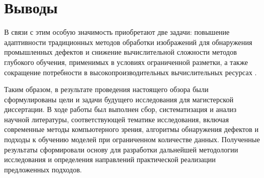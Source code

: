 \documentclass[14pt,a4paper]{article}
\begin{document}
\section{Выводы}
В связи с этим особую значимость приобретают две задачи: повышение адаптивности традиционных методов обработки изображений для обнаружения промышленных дефектов и снижение вычислительной сложности методов глубокого обучения, применимых в условиях ограниченной разметки, а также сокращение потребности в высокопроизводительных вычислительных ресурсах \cite{Hutten2024}.

Таким образом, в результате проведения настоящего обзора были сформулированы цели и задачи будущего исследования для магистерской диссертации. В ходе работы был выполнен сбор, систематизация и анализ научной литературы, соответствующей тематике исследования, включая современные методы компьютерного зрения, алгоритмы обнаружения дефектов и подходы к обучению моделей при ограниченном количестве данных. Полученные результаты сформировали основу для разработки дальнейшей методологии исследования и определения направлений практической реализации предложенных подходов.

\printbibliography
\end{document}
